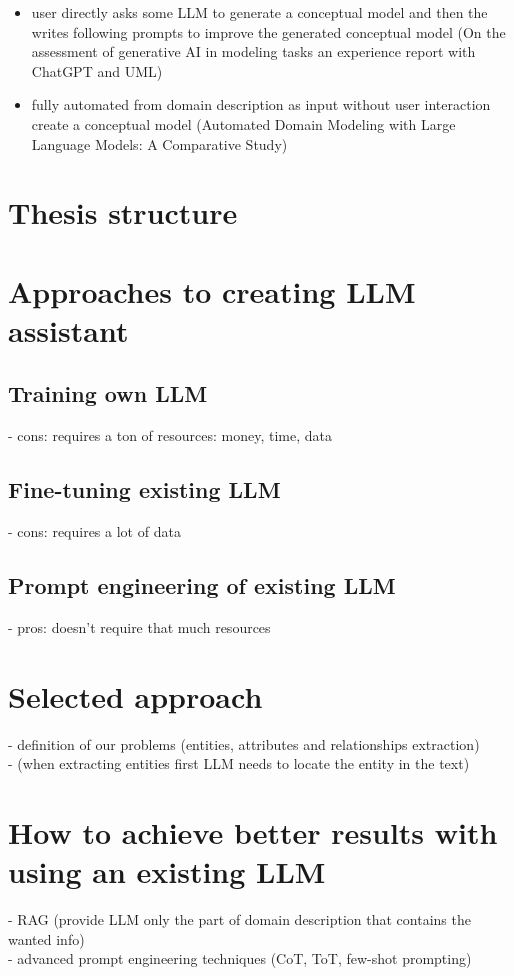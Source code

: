 \begin{itemize}
\item user directly asks some LLM to generate a conceptual model and then the writes following prompts to improve the generated conceptual model (On the assessment of generative AI in modeling tasks an experience report with ChatGPT and UML)

\item fully automated from domain description as input without user interaction create a conceptual model (Automated Domain Modeling with Large Language Models: A Comparative Study)
\end{itemize}


\section*{Thesis structure}


\section*{Approaches to creating LLM assistant}

\subsection*{Training own LLM}
- cons: requires a ton of resources: money, time, data


\subsection*{Fine-tuning existing LLM}
- cons: requires a lot of data


\subsection*{Prompt engineering of existing LLM}
- pros: doesn't require that much resources


\section*{Selected approach}

- definition of our problems (entities, attributes and relationships extraction) \\
- (when extracting entities first LLM needs to locate the entity in the text) \\

\section*{How to achieve better results with using an existing LLM}
- RAG (provide LLM only the part of domain description that contains the wanted info) \\
- advanced prompt engineering techniques (CoT, ToT, few-shot prompting) \\


